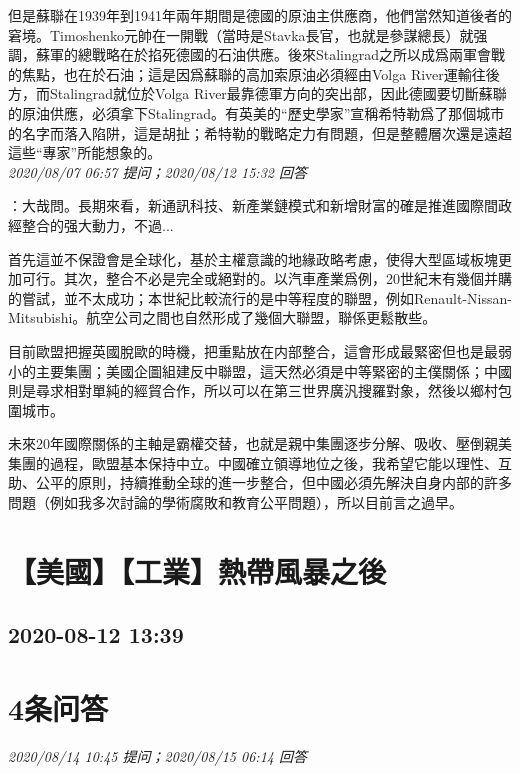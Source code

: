 \documentclass[twocolumn]{ctexart}
\begin{document}
但是蘇聯在1939年到1941年兩年期間是德國的原油主供應商，他們當然知道後者的窘境。Timoshenko元帥在一開戰（當時是Stavka長官，也就是參謀總長）就强調，蘇軍的總戰略在於掐死德國的石油供應。後來Stalingrad之所以成爲兩軍會戰的焦點，也在於石油；這是因爲蘇聯的高加索原油必須經由Volga River運輸往後方，而Stalingrad就位於Volga River最靠德軍方向的突出部，因此德國要切斷蘇聯的原油供應，必須拿下Stalingrad。有英美的“歷史學家”宣稱希特勒爲了那個城市的名字而落入陷阱，這是胡扯；希特勒的戰略定力有問題，但是整體層次還是遠超這些“專家”所能想象的。
\\

\textit{\hfill\noindent\small 2020/08/07 06:57 提问；2020/08/12 15:32 回答}

：大哉問。長期來看，新通訊科技、新產業鏈模式和新增財富的確是推進國際間政經整合的强大動力，不過...

首先這並不保證會是全球化，基於主權意識的地緣政略考慮，使得大型區域板塊更加可行。其次，整合不必是完全或絕對的。以汽車產業爲例，20世紀末有幾個并購的嘗試，並不太成功；本世紀比較流行的是中等程度的聯盟，例如Renault-Nissan-Mitsubishi。航空公司之間也自然形成了幾個大聯盟，聯係更鬆散些。

目前歐盟把握英國脫歐的時機，把重點放在内部整合，這會形成最緊密但也是最弱小的主要集團；美國企圖組建反中聯盟，這天然必須是中等緊密的主僕關係；中國則是尋求相對單純的經貿合作，所以可以在第三世界廣汎搜羅對象，然後以鄉村包圍城市。

未來20年國際關係的主軸是霸權交替，也就是親中集團逐步分解、吸收、壓倒親美集團的過程，歐盟基本保持中立。中國確立領導地位之後，我希望它能以理性、互助、公平的原則，持續推動全球的進一步整合，但中國必須先解決自身内部的許多問題（例如我多次討論的學術腐敗和教育公平問題），所以目前言之過早。
\\


\section{【美國】【工業】熱帶風暴之後}
\subsection{2020-08-12 13:39}


\section{4条问答}

\textit{\hfill\noindent\small 2020/08/14 10:45 提问；2020/08/15 06:14 回答}
\end{document}
